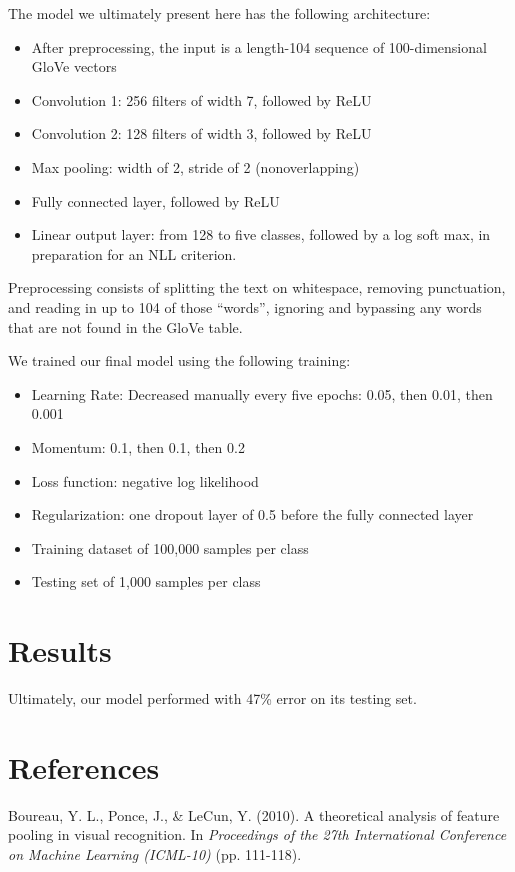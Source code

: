 \documentclass{article}
\newenvironment{itemizedense}{
\begin{itemize}
  \setlength{\itemsep}{1pt}
  \setlength{\parskip}{0pt}
  \setlength{\parsep}{0pt}
}{\end{itemize}}
\begin{document}
The model we ultimately present here has the following architecture:

\begin{itemizedense}
\item After preprocessing, the input is a length-104 sequence of 100-dimensional GloVe vectors
\item Convolution 1: 256 filters of width 7, followed by ReLU
\item Convolution 2: 128 filters of width 3, followed by ReLU
\item Max pooling: width of 2, stride of 2 (nonoverlapping)
\item Fully connected layer, followed by ReLU
\item Linear output layer: from 128 to five classes, followed by a log soft max, in preparation for an NLL criterion.
\end{itemizedense}

Preprocessing consists of splitting the text on whitespace, removing punctuation, and reading in up to 104 of those ``words'', ignoring and bypassing any words that are not found in the GloVe table.

We trained our final model using the following training:
\begin{itemizedense}
\item Learning Rate: Decreased manually every five epochs: 0.05, then 0.01, then 0.001
\item Momentum: 0.1, then 0.1, then 0.2
\item Loss function: negative log likelihood
\item Regularization: one dropout layer of 0.5 before the fully connected layer
\item Training dataset of 100,000 samples per class
\item Testing set of 1,000 samples per class
\end{itemizedense}

\section*{Results}

Ultimately, our model performed with 47\% error on its testing set.

\section*{References}

Boureau, Y. L., Ponce, J., \& LeCun, Y. (2010). A theoretical analysis of feature pooling in visual recognition. In \emph{Proceedings of the 27th International Conference on Machine Learning (ICML-10)} (pp. 111-118).
\end{document}
